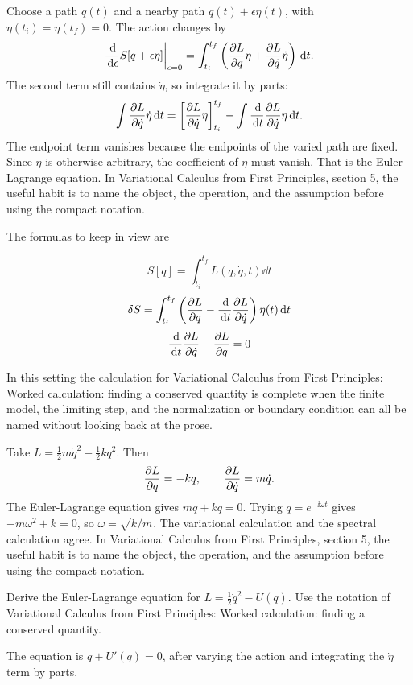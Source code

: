 Choose a path \(q(t)\) and a nearby path \(q(t)+\epsilon\eta(t)\), with \(\eta(t_i)=\eta(t_f)=0\).  The action changes by
\[
  \frac{\,\mathrm d}{\,\mathrm d\epsilon}S[q+\epsilon\eta]\bigg|_{\epsilon=0}
  =
  \int_{t_i}^{t_f}
  \left(
  \frac{\partial L}{\partial q}\eta+\frac{\partial L}{\partial\dot q}\dot\eta
  \right)\,\mathrm d t.
\]
The second term still contains \(\dot\eta\), so integrate it by parts:
\[
  \int \frac{\partial L}{\partial\dot q}\dot\eta\,\mathrm d t
  =
  \left[\frac{\partial L}{\partial\dot q}\eta\right]_{t_i}^{t_f}
  -
  \int \frac{\,\mathrm d}{\,\mathrm d t}\frac{\partial L}{\partial\dot q}\eta\,\mathrm d t.
\]
The endpoint term vanishes because the endpoints of the varied path are fixed.  Since \(\eta\) is otherwise arbitrary, the coefficient of \(\eta\) must vanish.  That is the Euler-Lagrange equation.  In Variational Calculus from First Principles, section 5, the useful habit is to name the object, the operation, and the assumption before using the compact notation.

The formulas to keep in view are

\[
  S[q]=\int_{t_i}^{t_f}L(q,\dot q,t)\dd t
\]
\[
  \delta S=\int_{t_i}^{t_f}\left(\frac{\partial L}{\partial q}-\frac{\,\mathrm d}{\,\mathrm d t}\frac{\partial L}{\partial\dot q}\right)\eta(t)\,\mathrm d t
\]
\[
  \frac{\,\mathrm d}{\,\mathrm d t}\frac{\partial L}{\partial\dot q}-\frac{\partial L}{\partial q}=0
\]

In this setting the calculation for Variational Calculus from First Principles: Worked calculation: finding a conserved quantity is complete when the finite model, the limiting step, and the normalization or boundary condition can all be named without looking back at the prose.




\begin{example}
Take \(L=\frac12m\dot q^2-\frac12kq^2\).  Then
\[
  \frac{\partial L}{\partial q}=-kq,\qquad \frac{\partial L}{\partial\dot q}=m\dot q.
\]
The Euler-Lagrange equation gives \(m\ddot q+kq=0\).  Trying \(q=e^{-\ii\omega t}\) gives \(-m\omega^2+k=0\), so \(\omega=\sqrt{k/m}\).  The variational calculation and the spectral calculation agree.  In Variational Calculus from First Principles, section 5, the useful habit is to name the object, the operation, and the assumption before using the compact notation.
\end{example}



\begin{exercise}
Derive the Euler-Lagrange equation for \(L=\frac12\dot q^2-U(q)\).  Use the notation of Variational Calculus from First Principles: Worked calculation: finding a conserved quantity.
\begin{answer}
The equation is \(\ddot q+U'(q)=0\), after varying the action and integrating the \(\dot\eta\) term by parts.
\end{answer}
\end{exercise}


